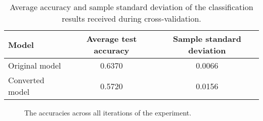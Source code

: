 \begin{table}[htbp]
    \centering
    \begin{tabularx}{\linewidth}{>{\raggedright\arraybackslash}Xcc}
    \toprule
        Model & Average test accuracy & Sample standard deviation \\
    \midrule
        Original model & 0.6370 & 0.0066 \\
        Converted model & 0.5720 & 0.0156 \\
    \bottomrule
    \end{tabularx}
    \caption{Average accuracy and sample standard deviation of the classification results received during cross-validation.}
    \label{tab:GTN_results}
\end{table}

\begin{figure}[htbp]
    \centering
    
    \caption{The accuracies across all iterations of the experiment.}
    \label{fig:GTN_graph}
\end{figure}

